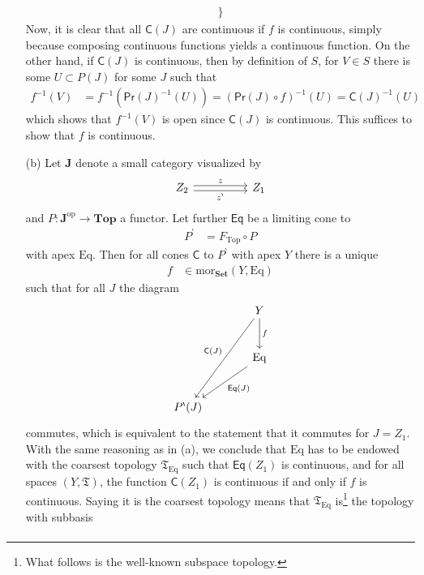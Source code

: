 \begin{prf}
\begin{enumerate}
\begin{align*}
  \rbrace
\end{align*}
Now, it is clear that all $\mathsf{C}(J)$ are continuous if $f$ is continuous, simply because composing continuous functions yields a continuous function.
On the other hand, if $\mathsf{C}(J)$ is continuous, then by definition of $S$, for $V \in S$ there is some $U \subset P(J)$ for some $J$ such that
\begin{align*}
  f^{-1}(V)
  &=
  f^{-1}(\mathsf{Pr}(J)^{-1}(U))
  =
  \left(
    \mathsf{Pr}(J)
    \circ
    f
  \right)^{-1}
  (U)
  =
  \mathsf{C}(J)^{-1}(U)
\end{align*}
which shows that $f^{-1}(V)$ is open since $\mathsf{C}(J)$ is continuous.
This suffices to show that $f$ is continuous.
\item[(b)]
Let $\mathbf{J}$ denote a small category visualized by
\[
\begin{tikzcd}[sep=huge]
  Z_{2}
  \arrow[shift left=0.5ex]{r}{z}
  \arrow[swap,shift right=0.5ex]{r}{z^{\backprime}}
  &
  Z_{1}
\end{tikzcd}
\]
and $P \colon \mathbf{J}^{\mathrm{op}} \rightarrow \mathbf{Top}$ a functor.
Let further $\mathsf{Eq}$ be a limiting cone to
\begin{align*}
  P^{\backprime}
  &=
  F_{\mathrm{Top}}
  \circ
  P
\end{align*}
with apex $\mathrm{Eq}$.
Then for all cones $\mathsf{C}$ to $P^{\backprime}$ with apex $Y$ there is a unique
\begin{align*}
  f
  &\in
  \mathrm{mor}_{\mathbf{Set}}
  \left(
    Y,
    \mathrm{Eq}
  \right)
\end{align*}
such that for all $J$ the diagram
\[
\begin{tikzcd}[sep=large]
  &
  Y
  \arrow{d}{f}
  \arrow[swap]{ddl}{\mathsf{C}(J)}
  \\
  &
  \mathrm{Eq}
  \arrow{dl}{\mathsf{Eq}(J)}
  \\
  P^{\backprime}(J)
\end{tikzcd}
\]
commutes, which is equivalent to the statement that it commutes for $J = Z_{1}$.
With the same reasoning as in (a), we conclude that $\mathrm{Eq}$ has to be endowed with the coarsest topology $\mathfrak{T}_{\mathrm{Eq}}$ such that $\mathsf{Eq}(Z_{1})$ is continuous, and for all spaces $(Y,\mathfrak{T})$, the function $\mathsf{C}(Z_{1})$ is continuous if and only if $f$ is continuous.
Saying it is the coarsest topology means that $\mathfrak{T}_{\mathrm{Eq}}$ is\footnote{What follows is the well-known subspace topology.} the topology with subbasis
\begin{align*}

\end{align*}
\end{enumerate}
\end{prf}
